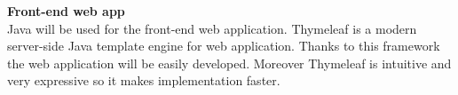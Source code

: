 \noindent\textbf{Front-end web app}\\
Java will be used for the front-end web application. Thymeleaf is a modern server-side Java template engine for web application. Thanks to this framework the web application 
will be easily developed. Moreover Thymeleaf is intuitive and very expressive so it makes implementation faster.

